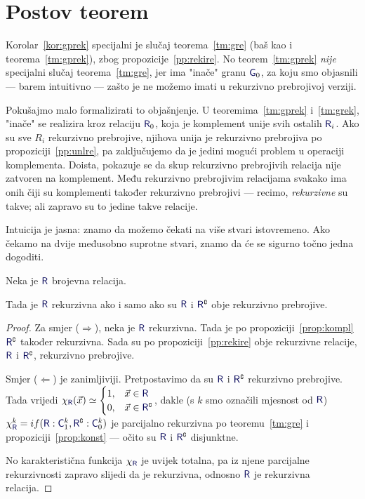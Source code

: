 \section{Postov teorem}\label{sec:Post}

Korolar~\ref{kor:gprek} specijalni je slučaj teorema~\ref{tm:gre} (baš kao i teorema~\ref{tm:gprek}), zbog propozicije~\ref{pp:rekire}. No teorem~\ref{tm:gprek} \emph{nije} specijalni slučaj teorema~\ref{tm:gre}, jer ima "inače" granu $\f G_0$, za koju smo objasnili --- barem intuitivno --- zašto je ne možemo imati u rekurzivno prebrojivoj verziji.

Pokušajmo malo formalizirati to objašnjenje. U teoremima~\ref{tm:gprek} i~\ref{tm:grek}, "inače" se realizira kroz relaciju $\f R_0$, koja je komplement unije svih ostalih $\f R_i$. Ako su sve $R_i$ rekurzivno prebrojive, njihova unija je rekurzivno prebrojiva po propoziciji~\ref{pp:unlre}, pa zaključujemo da je jedini mogući problem u operaciji komplementa. Doista, pokazuje se da skup rekurzivno prebrojivih relacija nije zatvoren na komplement. Među rekurzivno prebrojivim relacijama svakako ima onih čiji su komplementi također rekurzivno prebrojivi --- recimo, \emph{rekurzivne} su takve; ali zapravo su to jedine takve relacije.

Intuicija je jasna: znamo da možemo čekati na više stvari istovremeno. Ako čekamo na dvije međusobno suprotne stvari, znamo da će se sigurno točno jedna dogoditi.

\begin{teorem}\label{tm:Post}
Neka je $\f R$ brojevna relacija.
    
    Tada je $\f R$ rekurzivna ako i samo ako su $\f R$ i $\f R\kompl$ obje rekurzivno prebrojive.
\end{teorem}
\begin{proof}
Za smjer ($\Rightarrow$), neka je $\f R$ rekurzivna. Tada je po propoziciji~\ref{prop:kompl} $\f R\kompl$ također rekurzivna. Sada su po propoziciji~\ref{pp:rekire} obje rekurzivne relacije, $\f R$ i $\f R\kompl$, rekurzivno prebrojive.

Smjer ($\Leftarrow$) je zanimljiviji. Pretpostavimo da su $\f R$ i $\f R\kompl$ rekurzivno prebrojive. Tada vrijedi
$
    \chi_{\f R}(\vec x)\simeq\begin{cases}
    1,&\vec x\in\f R\\
    0,&\vec x\in\f R\kompl
    \end{cases}$\text,
dakle (s $k$ smo označili mjesnost od $\f R$) $\chi^k_{\f R}=\IF{\f R:\f C_1^k,\f R\kompl:\f C_0^k}$ je parcijalno rekurzivna po teoremu~\ref{tm:gre} i propoziciji~\ref{prop:konst} --- očito su $\f R$ i $\f R\kompl$ disjunktne.

No karakteristična funkcija $\chi_{\f R}$ je uvijek totalna, pa iz njene parcijalne rekurzivnosti zapravo slijedi da je rekurzivna, odnosno $\f R$ je rekurzivna relacija.
\end{proof}

